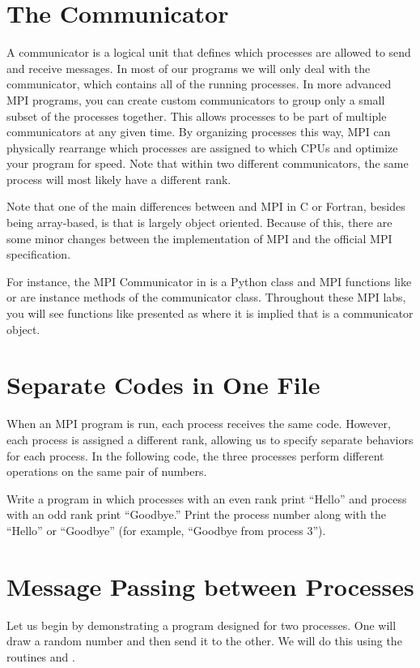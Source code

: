 \section*{The Communicator}
A communicator is a logical unit that defines which processes are allowed to send and receive messages.
In most of our programs we will only deal with the  communicator, which contains all of the running processes.
In more advanced MPI programs, you can create custom communicators to group only a small subset of the processes together.
This allows processes to be part of multiple communicators at any given time.
By organizing processes this way, MPI can physically rearrange which processes are assigned to which CPUs and optimize your program for speed.
Note that within two different communicators, the same process will most likely have a different rank.

Note that one of the main differences between  and MPI in C or Fortran, besides being array-based, is that  is largely object oriented.
Because of this, there are some minor changes between the  implementation of MPI and the official MPI specification.

For instance, the MPI Communicator in  is a Python class and MPI functions like  or  are instance methods of the communicator class.
Throughout these MPI labs, you will see functions like  presented as  where it is implied that  is a communicator object.

\section*{Separate Codes in One File}
When an MPI program is run, each process receives the same code.
However, each process is assigned a different rank, allowing us to specify separate behaviors for each process.
In the following code, the three processes perform different operations on the same pair of numbers.


\begin{problem}
Write a program in which processes with an even rank print ``Hello'' and process with an odd rank print ``Goodbye.''
Print the process number along with the ``Hello'' or ``Goodbye''
(for example, ``Goodbye from process 3'').
\end{problem}

\section*{Message Passing between Processes}
Let us begin by demonstrating a program designed for two processes.
One will draw a random number and then send it to the other.
We will do this using the routines  and .

